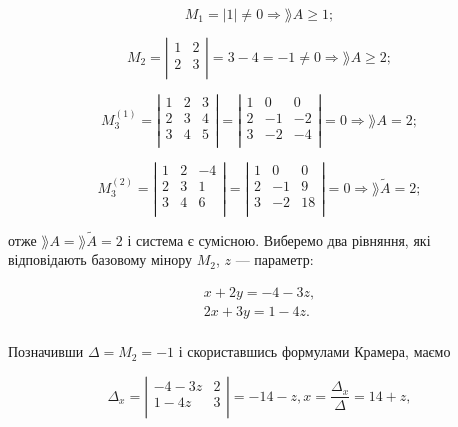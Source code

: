 $$M_1 = |1| \neq 0 \Rightarrow \rang A \geqslant 1;$$

$$M_2 = \left| \begin{matrix}
	1 & 2 \\
	2 & 3 \\
\end{matrix} \right| = 3 - 4 = -1 \neq 0 \Rightarrow \rang A \geqslant 2;$$

$$M_3^{(1)} = \left| \begin{matrix}
	1 & 2 & 3 \\
	2 & 3 & 4 \\
	3 & 4 & 5 \\
\end{matrix} \right| = \left| \begin{matrix}
	1 &  0 &  0 \\
	2 & -1 & -2 \\
	3 & -2 & -4 \\
\end{matrix} \right| = 0 \Rightarrow \rang A = 2;$$

$$M_3^{(2)} = \left| \begin{matrix}
	1 & 2 & -4 \\
	2 & 3 & 1 \\
	3 & 4 & 6 \\
\end{matrix} \right| = \left| \begin{matrix}
	1 &  0 &  0 \\
	2 & -1 &  9 \\
	3 & -2 & 18 \\
\end{matrix} \right| = 0 \Rightarrow \rang \tilde{A} = 2;$$


отже $\rang A = \rang \tilde{A} = 2$ і система є сумісною. Виберемо два рівняння, які
відповідають базовому мінору $M_2$, $z$ --- параметр:

$$\begin{matrix}
	x + 2y = -4 -3z, \\
	2x + 3y = 1 -4z. \\
\end{matrix}$$

Позначивши $\Delta = M_2 = -1$ і скориставшись формулами Крамера, маємо

$$\Delta_x = \left| \begin{matrix}
	-4 -3z & 2 \\
	 1 -4z & 3 \\
\end{matrix} \right| = -14 -z, x = \dfrac{\Delta_x}{\Delta} = 14 + z,$$

